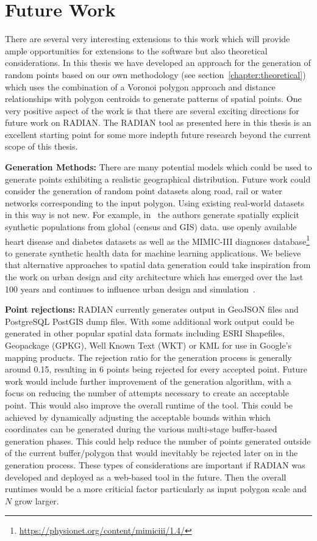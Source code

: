 \section{Future Work}
\label{section:futurework}
There are several very interesting extensions to this work which will provide ample opportunities for extensions to the software but also theoretical considerations. In this thesis we have developed an approach for the generation of random points based on our own methodology (see section~\ref{chapter:theoretical}) which uses the combination of a Voronoi polygon approach and distance relationships with polygon centroids to generate patterns of spatial points. One very positive aspect of the work is that there are several exciting directions for future work on RADIAN. The RADIAN tool as presented here in this thesis is an excellent starting point for some more indepth future research beyond the current scope of this thesis.

\textbf{Generation Methods:} There are many potential models which could be used to generate points exhibiting a realistic geographical distribution. Future work could consider the generation of random point datasets along road, rail or water networks corresponding to the input polygon. Using existing real-world datasets in this way is not new. For example, in~\citet{doi:10.1080/13658816.2018.1440563} the authors generate spatially explicit synthetic populations from global (census and GIS) data. \citet{10.1093/jamia/ocaa303} use openly available heart disease and diabetes datasets as well as the MIMIC-III diagnoses database\footnote{\url{https://physionet.org/content/mimiciii/1.4/}} to generate synthetic health data  for machine learning applications. We believe that alternative approaches to spatial data generation could take inspiration from the work on urban design and city architecture which has emerged over the last 100 years and continues to influence urban design and simulation~\citep{doi:10.1177/1420326X20976058,alonso2018cityscope}.

\textbf{Point rejections:} RADIAN currently generates output in GeoJSON files and PostgreSQL PostGIS dump files. With some additional work output could be generated in other popular spatial data formats including ESRI Shapefiles, Geopackage (GPKG), Well Known Text (WKT) or KML for use in Google's mapping products. The rejection ratio for the generation process is generally around 0.15, resulting in 6 points being rejected for every accepted point. Future work would include further improvement of the generation algorithm, with a focus on reducing the number of attempts necessary to create an acceptable point. This would also improve the overall runtime of the tool. This could be achieved by dynamically adjusting the acceptable bounds within which coordinates can be generated during the various multi-stage buffer-based generation phases. This could help reduce the number of points generated outside of the current buffer/polygon that would inevitably be rejected later on in the generation process. These types of considerations are important if RADIAN was developed and deployed as a web-based tool in the future. Then the overall runtimes would be a more criticial factor particularly as input polygon scale and $N$ grow larger. 
